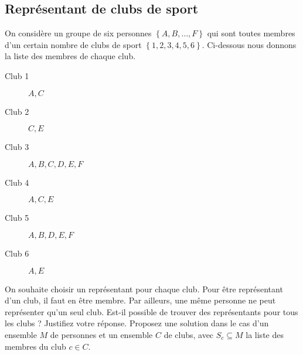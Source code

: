 \subsection{Représentant de clubs de sport}
On considère un groupe de six personnes $\left\lbrace A, B, \ldots, F \right\rbrace$ qui sont toutes membres d'un certain nombre de clubs de sport $\left\lbrace 1, 2, 3, 4, 5, 6 \right\rbrace$. Ci-dessous nous donnons la liste des membres de chaque club.
\begin{description}
  \item [Club 1] $A, C$
  \item [Club 2] $C, E$
  \item [Club 3] $A, B, C, D, E, F$
  \item [Club 4] $A, C, E$
  \item [Club 5] $A, B, D, E, F$
  \item [Club 6] $A, E$
\end{description}
On souhaite choisir un représentant pour chaque club.
Pour être représentant d'un club, il faut en être membre.
Par ailleurs, une même personne ne peut représenter qu'un seul club.
Est-il possible de trouver des représentants pour tous les clubs ?
Justifiez votre réponse.
Proposez une solution dans le cas d'un ensemble $M$ de personnes
et un ensemble $C$ de clubs, avec $S_c \subseteq M$ la liste des membres du club $c \in C$.

